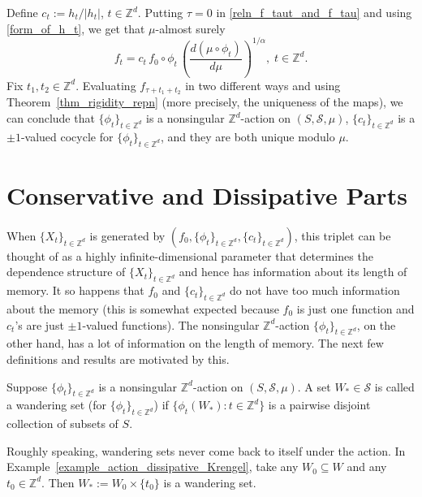 \documentclass[12pt]{amsart}
\begin{document}
Define $c_t:=h_t/|h_t|$, $t \in {\mathbb{Z}^d}$. Putting $\tau =0$ in \eqref{reln_f_taut_and_f_tau} and using \eqref{form_of_h_t}, we get that $\mu$-almost surely
\[
f_t = c_t\,f_0 \circ \phi_t\,\left(\frac{d(\mu \circ \phi_t)}{d\mu}\right)^{1/\alpha}, \;t \in {\mathbb{Z}^d}.
\]
Fix $t_1, t_2 \in {\mathbb{Z}^d}$. Evaluating $f_{\tau + t_1 + t_2}$ in two different ways and using Theorem~\ref{thm_rigidity_repn} (more precisely, the uniqueness of the maps), we can conclude that ${\{\phi_t\}_{t \in \mathbb{Z}^d}}$ is a nonsingular ${\mathbb{Z}^d}$-action on $(S, \mathcal{S}, \mu)$, $\{c_t\}_{t \in {\mathbb{Z}^d}}$ is a $\pm 1$-valued cocycle for ${\{\phi_t\}_{t \in \mathbb{Z}^d}}$, and they are both unique modulo $\mu$.

\section{Conservative and Dissipative Parts} \label{sec:cons_diss_parts}

When ${\{X_t\}_{t \in \mathbb{Z}^d}}$ is generated by $\left(f_0, {\{\phi_t\}_{t \in \mathbb{Z}^d}}, \{c_t\}_{t \in {\mathbb{Z}^d}}\right)$, this triplet can be thought of as a highly infinite-dimensional parameter that determines the dependence structure of ${\{X_t\}_{t \in \mathbb{Z}^d}}$ and hence has information about its length of memory. It so happens that $f_0$ and $\{c_t\}_{t \in {\mathbb{Z}^d}}$ do not have too much information about the memory (this is somewhat expected because $f_0$ is just one function and $c_t$'s are just $\pm 1$-valued functions). The nonsingular ${\mathbb{Z}^d}$-action ${\{\phi_t\}_{t \in \mathbb{Z}^d}}$, on the other hand, has a lot of information on the length of memory. The next few definitions and results are motivated by this.

\begin{defn} Suppose ${\{\phi_t\}_{t \in \mathbb{Z}^d}}$ is a nonsingular ${\mathbb{Z}^d}$-action on  $(S,\mathcal{S}, \mu)$. A set $W_\ast \in  \mathcal{S}$ is called a wandering set (for ${\{\phi_t\}_{t \in \mathbb{Z}^d}}$) if $\{\phi_t(W_\ast): t \in {\mathbb{Z}^d}\}$ is a pairwise disjoint collection of subsets of $S$.
\end{defn}

Roughly speaking, wandering sets never come back to itself under the action. In Example~\ref{example_action_dissipative_Krengel}, take any $W_0 \subseteq W$ and any $t_0 \in {\mathbb{Z}^d}$. Then $W_\ast:=W_0 \times \{t_0\}$ is a wandering set.

\normalsize
\end{document}
